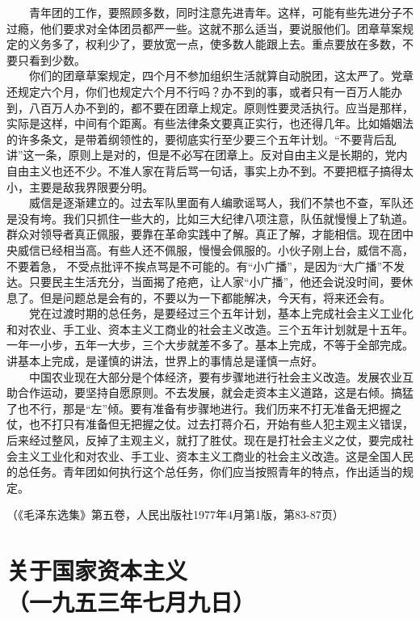 \documentclass[cn,11pt,chinese]{elegantbook}
\def\myformat#1{\hfil\hfil #1}
\begin{document}
　　青年团的工作，要照顾多数，同时注意先进青年。这样，可能有些先进分子不过瘾，他们要求对全体团员都严一些。这就不那么适当，要说服他们。团章草案规定的义务多了，权利少了，要放宽一点，使多数人能跟上去。重点要放在多数，不要只看到少数。\\
　　你们的团章草案规定，四个月不参加组织生活就算自动脱团，这太严了。党章还规定六个月，你们也规定六个月不行吗？办不到的事，或者只有一百万人能办到，八百万人办不到的，都不要在团章上规定。原则性要灵活执行。应当是那样，实际是这样，中间有个距离。有些法律条文要真正实行，也还得几年。比如婚姻法的许多条文，是带着纲领性的，要彻底实行至少要三个五年计划。“不要背后乱讲”这一条，原则上是对的，但是不必写在团章上。反对自由主义是长期的，党内自由主义也还不少。不准人家在背后骂一句话，事实上办不到。不要把框子搞得太小，主要是敌我界限要分明。\\
　　威信是逐渐建立的。过去军队里面有人编歌谣骂人，我们不禁也不查，军队还是没有垮。我们只抓住一些大的，比如三大纪律八项注意，队伍就慢慢上了轨道。群众对领导者真正佩服，要靠在革命实践中了解。真正了解，才能相信。现在团中央威信已经相当高。有些人还不佩服，慢慢会佩服的。小伙子刚上台，威信不高， 不要着急， 不受点批评不挨点骂是不可能的。有“小广播”，是因为“大广播”不发达。只要民主生活充分，当面揭了疮疤，让人家“小广播”，他还会说没时间，要休息了。但是问题总是会有的，不要以为一下都能解决，今天有，将来还会有。\\
　　党在过渡时期的总任务，是要经过三个五年计划，基本上完成社会主义工业化和对农业、手工业、资本主义工商业的社会主义改造。三个五年计划就是十五年。一年一小步，五年一大步，三个大步就差不多了。基本上完成，不等于全部完成。讲基本上完成，是谨慎的讲法，世界上的事情总是谨慎一点好。\\
　　中国农业现在大部分是个体经济，要有步骤地进行社会主义改造。发展农业互助合作运动，要坚持自愿原则。不去发展，就会走资本主义道路，这是右倾。搞猛了也不行，那是“左”倾。要有准备有步骤地进行。我们历来不打无准备无把握之仗，也不打只有准备但无把握之仗。过去打蒋介石，开始有些人犯主观主义错误，后来经过整风，反掉了主观主义，就打了胜仗。现在是打社会主义之仗，要完成社会主义工业化和对农业、手工业、资本主义工商业的社会主义改造。这是全国人民的总任务。青年团如何执行这个总任务，你们应当按照青年的特点，作出适当的规定。\\
\begin{flushright}（《毛泽东选集》第五卷，人民出版社1977年4月第1版，第83-87页）\end{flushright}
\newpage\section*{\myformat{关于国家资本主义}\\\myformat{（一九五三年七月九日）}}
\end{document}
